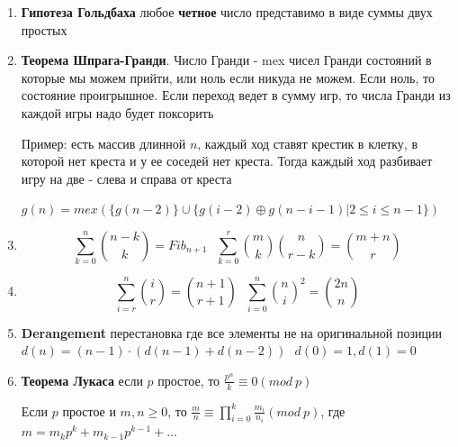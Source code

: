 \begin{enumerate}
    \item \textbf{Гипотеза Гольдбаха} любое \textbf{четное} число представимо в виде суммы двух простых
    \item \textbf{Теорема Шпрага-Гранди}. Число Гранди - mex чисел Гранди состояний в которые мы можем прийти, или ноль если никуда не можем. Если ноль, то состояние проигрышное. Если переход ведет в сумму игр, то числа Гранди из каждой игры надо будет поксорить
    
    Пример: есть массив длинной $n$, каждый ход ставят крестик в клетку, в которой нет креста и у ее соседей нет креста. Тогда каждый ход разбивает игру на две - слева и справа от креста
    
    $g(n) = mex(\{g(n-2)\} \cup \{ g(i - 2) \oplus g(n-i-1) | 2 \le i \le n-1 \})$

    \item \[ \sum_{k=0}^{n} \binom{n-k}{k} = Fib_{n+1} ~~~ \sum_{k=0}^{r} \binom{m}{k} \binom{n}{r-k} = \binom{m+n}{r}\]
    \item \[ \sum_{i=r}^{n} \binom{i}{r} = \binom{n+1}{r+1} ~~~ \sum_{i=0}^n \binom{n}{i}^2 = \binom{2n}{n} \]
    \item \textbf{Derangement} перестановка где все элементы не на оригинальной позиции $d(n) = (n-1) \cdot (d(n-1) + d(n-2)) ~~~ d(0) = 1, d(1) = 0$
    \item \textbf{Теорема Лукаса} если $p$ простое, то $\frac{p^{\alpha}}{k} \equiv 0 (mod ~ p)$
    
    Если $p$ простое и $m, n \ge 0$, то $\frac{m}{n} \equiv \prod^{k}_{i=0} \frac{m_i}{n_i} (mod ~ p)$, где $m = m_k p^k + m_{k-1}p^{k-1} + ...$


\end{enumerate}

